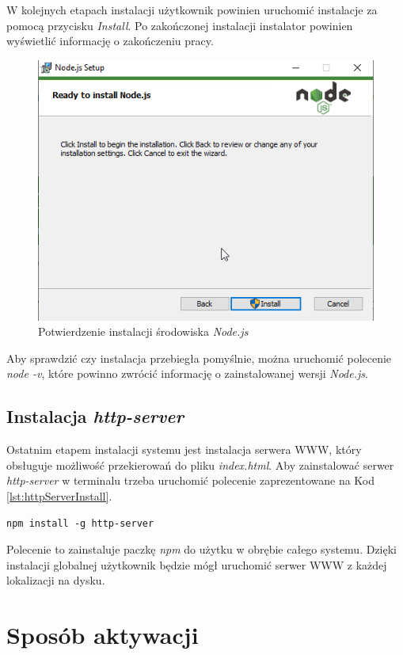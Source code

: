 \documentclass[a4paper,twoside,12pt]{book}
\begin{document}
W kolejnych etapach instalacji użytkownik powinien uruchomić instalacje za pomocą przycisku \textit{Install}. Po zakończonej instalacji instalator powinien wyświetlić informację o zakończeniu pracy.
\begin{figure}[h!]
	\centering
	\includegraphics[width=0.55\linewidth]{../zrzuty_ekranu/instalacja_nodejs/node6}
	\caption{Potwierdzenie instalacji środowiska \textit{Node.js}}
	\label{fig:node6}
\end{figure}
\FloatBarrier

Aby sprawdzić czy instalacja przebiegła pomyślnie, można uruchomić polecenie \textit{node -v}, które powinno zwrócić informację o zainstalowanej wersji \textit{Node.js}.

\subsection {Instalacja \textit{http-server}}
Ostatnim etapem instalacji systemu jest instalacja serwera WWW, który obsługuje możliwość przekierowań do pliku \textit{index.html}. Aby zainstalować serwer \textit{http-server} w terminalu trzeba uruchomić polecenie zaprezentowane na Kod \ref{lst:httpServerInstall}.
\begin{lstlisting}[caption={Instalacja paczki \textit{http-server}}, label={lst:httpServerInstall}]
	npm install -g http-server
\end{lstlisting}

Polecenie to zainstaluje paczkę \textit{npm} do użytku w obrębie całego systemu. Dzięki instalacji globalnej użytkownik będzie mógł uruchomić serwer WWW z każdej lokalizacji na dysku.

\section {Sposób aktywacji}
\end{document}
